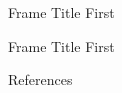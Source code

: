 \documentclass[169,8pt]{beamer}
\begin{document}
        \begin{frame}{Frame Title}
            First
        \end{frame}


        \begin{frame}{Frame Title}
            First
        \end{frame}

        \begin{frame}[allowframebreaks]{References}
            \printbibliography
        \end{frame}

\appendix

\end{document}
